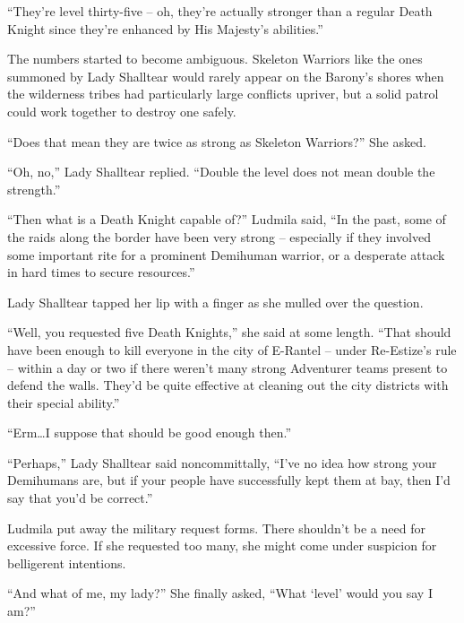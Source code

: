  

“They’re level thirty-five – oh, they're actually stronger than a regular Death Knight since they're enhanced by His Majesty’s abilities.”

 

The numbers started to become ambiguous. Skeleton Warriors like the ones summoned by Lady Shalltear would rarely appear on the Barony’s shores when the wilderness tribes had particularly large conflicts upriver, but a solid patrol could work together to destroy one safely.

 

“Does that mean they are twice as strong as Skeleton Warriors?” She asked.

 

“Oh, no,” Lady Shalltear replied. “Double the level does not mean double the strength.”

 

“Then what is a Death Knight capable of?” Ludmila said, “In the past, some of the raids along the border have been very strong – especially if they involved some important rite for a prominent Demihuman warrior, or a desperate attack in hard times to secure resources.”

 

Lady Shalltear tapped her lip with a finger as she mulled over the question.

 

“Well, you requested five Death Knights,” she said at some length. “That should have been enough to kill everyone in the city of E-Rantel – under Re-Estize’s rule – within a day or two if there weren’t many strong Adventurer teams present to defend the walls. They’d be quite effective at cleaning out the city districts with their special ability.”

 

“Erm…I suppose that should be good enough then.”

 

“Perhaps,” Lady Shalltear said noncommittally, “I’ve no idea how strong your Demihumans are, but if your people have successfully kept them at bay, then I’d say that you’d be correct.”

 

Ludmila put away the military request forms. There shouldn’t be a need for excessive force. If she requested too many, she might come under suspicion for belligerent intentions.

 

“And what of me, my lady?” She finally asked, “What ‘level’ would you say I am?”

